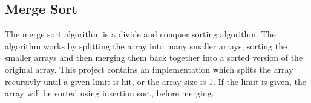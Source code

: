 \subsection{Merge Sort}
The merge sort algorithm is a divide and conquer sorting algorithm. The algorithm works by splitting the array into many smaller arrays, sorting the smaller arrays and then merging them back together into a sorted version of the original array. This project contains an implementation which splits the array recursivly until a given limit is hit, or the array size is 1. If the limit is given, the array will be sorted using insertion sort, before merging.